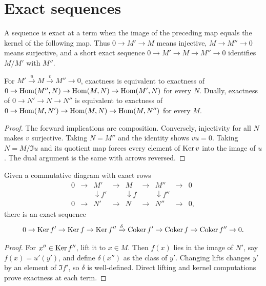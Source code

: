 \section{Exact sequences}
\label{am-ch2-exact}
\begin{definition}[Exactness]
\label{am-def-exact}
\uses{}
A sequence is exact at a term when the image of the preceding map equals the
kernel of the following map.  Thus $0\to M'\to M$ means injective,
$M\to M''\to0$ means surjective, and a short exact sequence
$0\to M'\to M\to M''\to0$ identifies $M/M'$ with $M''$.
\end{definition}
\begin{proposition}
\label{am-prop-2-9}
\uses{}
For $M'\xrightarrow{u}M\xrightarrow{v}M''\to0$, exactness is equivalent to
exactness of $0\to\operatorname{Hom}(M'',N)\to\operatorname{Hom}(M,N)\to\operatorname{Hom}(M',N)$ for every $N$.
Dually, exactness of $0\to N'\to N\to N''$ is equivalent to exactness of
$0\to\operatorname{Hom}(M,N')\to\operatorname{Hom}(M,N)\to\operatorname{Hom}(M,N'')$ for every $M$.
\end{proposition}
\begin{proof}
The forward implications are composition.  Conversely, injectivity for all
$N$ makes $v$ surjective.  Taking $N=M''$ and the identity shows $vu=0$.
Taking $N=M/\Im u$ and its quotient map forces every element of $\operatorname{Ker} v$ into
the image of $u$.  The dual argument is the same with arrows reversed.
\end{proof}
\begin{proposition}
\label{am-prop-2-10}
\uses{}
Given a commutative diagram with exact rows
\[
\begin{array}{ccccccccc}
0&\to&M'&\to&M&\to&M''&\to&0\\
 &&\downarrow f'&&\downarrow f&&\downarrow f''&&\\
0&\to&N'&\to&N&\to&N''&\to&0,
\end{array}
\]
there is an exact sequence
\[
0\to\operatorname{Ker} f'\to\operatorname{Ker} f\to\operatorname{Ker} f''\xrightarrow{\delta}
\operatorname{Coker} f'\to\operatorname{Coker} f\to\operatorname{Coker} f''\to0.
\]
\end{proposition}
\begin{proof}
For $x''\in\operatorname{Ker} f''$, lift it to $x\in M$.  Then $f(x)$ lies in the image of
$N'$, say $f(x)=u'(y')$, and define $\delta(x'')$ as the class of $y'$.
Changing lifts changes $y'$ by an element of $\Im f'$, so $\delta$ is
well-defined.  Direct lifting and kernel computations prove exactness at each
term.
\end{proof}
